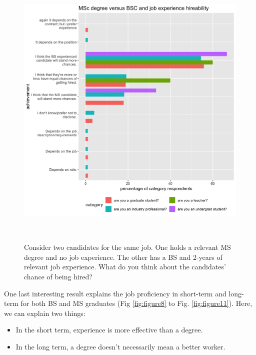 \documentclass{sigchi}
\begin{document}
\begin{figure}
 \includegraphics[scale=0.2]{../data-analysis/plots_output/MSc_degree_versus_BSC_and_job_experience_hireability.png}
  \caption{Consider two candidates for the same job. One holds a relevant MS degree and no job experience. The other has a BS and 2-years of relevant job experience. What do you think about the candidates' chance of being hired?}~\label{fig:figure7}
\end{figure}

One last interesting result explains the job proficiency in short-term and long-term for both BS and MS graduates (Fig \ref{fig:figure8} to Fig. \ref{fig:figure11}). Here, we can explain two things:
\begin{itemize}
	\item In the short term, experience is more effective than a degree.
	\item In the long term, a degree doesn't necessarily mean a better worker.	
\end{itemize}
\end{document}
